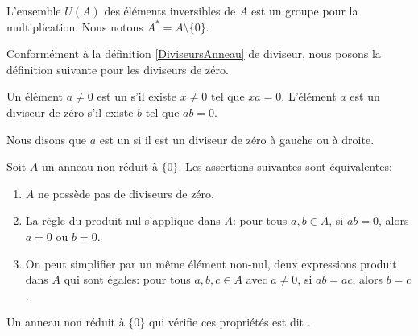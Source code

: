 L'ensemble \( U(A)\) des éléments inversibles de \( A\) est un groupe pour la multiplication. Nous notons \( A^*=A\setminus\{ 0 \}\).

Conformément à la définition \ref{DiviseursAnneau} de diviseur, nous posons la définition suivante pour les diviseurs de zéro.
\begin{definition}
    Un élément \( a\neq 0\) est un  s'il existe \( x\neq 0\) tel que $xa=0$. L'élément \( a\) est un diviseur de zéro  s'il existe \( b\) tel que \( ab=0\).

    Nous disons que \( a\) est un  si il est un diviseur de zéro à gauche ou à droite.
\end{definition}

\begin{propositionDef}           \label{DEFooTAOPooWDPYmd}
    Soit $A$ un anneau non réduit à \( \{ 0 \}\). Les assertions suivantes sont équivalentes:
    \begin{enumerate}
        \item       \label{ITEMooMXMKooXMYpkN}
            \( A\) ne possède pas de diviseurs de zéro.
        \item       \label{ITEMooLAJCooFwxXrV}
            La règle du produit nul s'applique dans $A$: pour tous \( a, b \in A \), si \( ab=0\), alors \( a = 0\) ou \( b = 0\).
        \item       \label{ITEMooQNTFooSRrVPK}
            On peut simplifier par un même élément non-nul, deux expressions produit dans $A$ qui sont égales: pour tous \( a, b, c \in A \) avec \( a \neq 0 \), si \( ab = ac \), alors \( b = c \).
    \end{enumerate}
    Un anneau non réduit à \( \{ 0 \}\) qui vérifie ces propriétés est dit .
\end{propositionDef}

